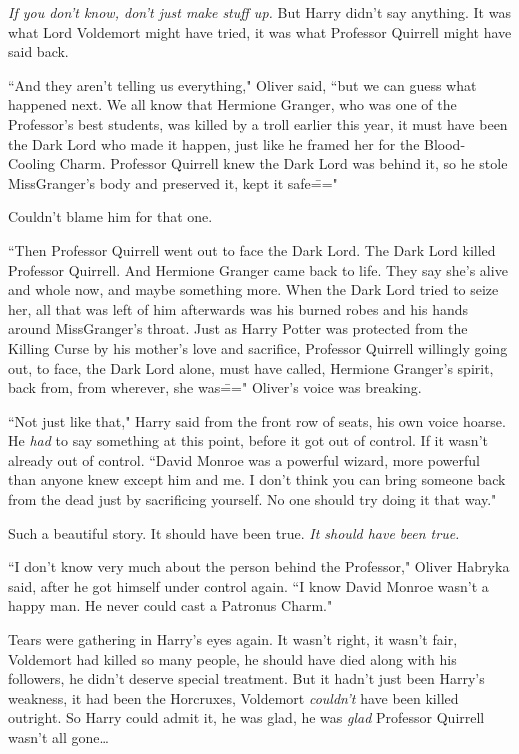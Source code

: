 \emph{If you don't know, don't just make stuff up.} But Harry didn't say anything. It was what Lord Voldemort might have tried, it was what Professor Quirrell might have said back.

``And they aren't telling us everything," Oliver said, ``but we can guess what happened next. We all know that Hermione Granger, who was one of the Professor's best students, was killed by a troll earlier this year, it must have been the Dark Lord who made it happen, just like he framed her for the Blood-Cooling Charm. Professor Quirrell knew the Dark Lord was behind it, so he stole Miss\?Granger's body and preserved it, kept it safe\==="

Couldn't blame him for that one.

``Then Professor Quirrell went out to face the Dark Lord. The Dark Lord killed Professor Quirrell. And Hermione Granger came back to life. They say she's alive and whole now, and maybe something more. When the Dark Lord tried to seize her, all that was left of him afterwards was his burned robes and his hands around Miss\?Granger's throat. Just as Harry Potter was protected from the Killing Curse by his mother's love and sacrifice, Professor Quirrell willingly going out, to face, the Dark Lord alone, must have called, Hermione Granger's spirit, back from, from wherever, she was\===" Oliver's voice was breaking.

``Not just like that," Harry said from the front row of seats, his own voice hoarse. He \emph{had} to say something at this point, before it got out of control. If it wasn't already out of control. ``David Monroe was a powerful wizard, more powerful than anyone knew except him and me. I don't think you can bring someone back from the dead just by sacrificing yourself. No one should try doing it that way."

Such a beautiful story. It should have been true. \emph{It should have been true.}

``I don't know very much about the person behind the Professor," Oliver Habryka said, after he got himself under control again. ``I know David Monroe wasn't a happy man. He never could cast a Patronus Charm."

Tears were gathering in Harry's eyes again. It wasn't right, it wasn't fair, Voldemort had killed so many people, he should have died along with his followers, he didn't deserve special treatment. But it hadn't just been Harry's weakness, it had been the Horcruxes, Voldemort \emph{couldn't} have been killed outright. So Harry could admit it, he was glad, he was \emph{glad} Professor Quirrell wasn't all gone{\ldots}

